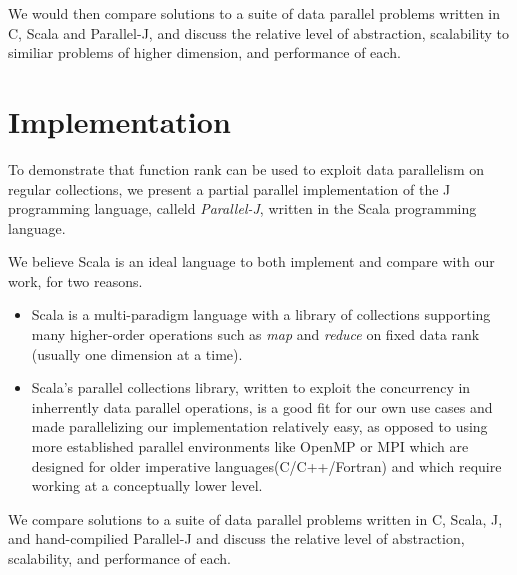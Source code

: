 We would then compare solutions to a suite of data parallel problems written in C, Scala and Parallel-J,
and discuss the relative level of abstraction, scalability to similiar problems of higher dimension, and performance of each.

\section{Implementation}
\label{imp}
To demonstrate that function rank can be used to exploit data parallelism on regular collections, we present a partial parallel implementation of the J programming language, calleld \textit{Parallel-J}, written in the Scala programming language.\begin{comment}TODO cite?\end{comment}
We believe Scala is an ideal language to both implement and compare with our work, for two reasons.
\begin{itemize}
    \item Scala is a multi-paradigm language with a library of collections supporting many higher-order operations such as \textit{map} and \textit{reduce} on fixed data rank (usually one dimension at a time). %
    \item Scala's parallel collections library\cite{pc}, written to exploit the concurrency in inherrently data parallel operations, is a good fit for our own use cases and made parallelizing our implementation relatively easy, as opposed to using more established parallel environments like OpenMP or MPI which are designed for older imperative languages(C/C++/Fortran) and which require working at a conceptually lower level.
\end{itemize}
We compare solutions to a suite of data parallel problems written in C, Scala, J, and hand-compilied Parallel-J %
and discuss the relative level of abstraction, scalability, and performance of each.

\nocite{rankanduni}
\nocite{dph}

\begin{comment}
Data rank is simply the rank of a collection, and scalar values are considered to be collections of rank 0.
Thus, the rank of some regular collection is a non-negative integer.%
Function rank is a rank 1 collection of each of the associated data rank values of a function's expected arguments, usually with some value to represent when the function can take data of any rank for a specific argument.
\end{comment}

